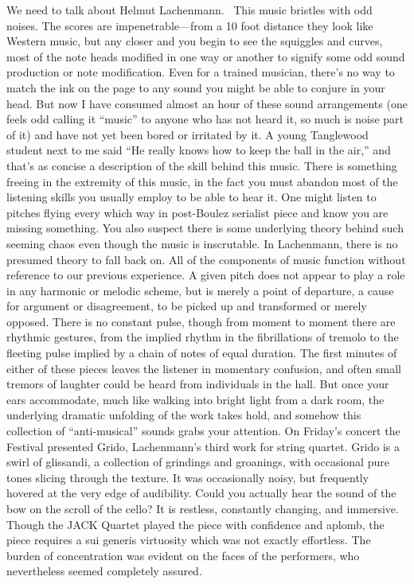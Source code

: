 We need to talk about Helmut Lachenmann.  This music bristles with odd noises. The scores are impenetrable—from a 10 foot distance they look like Western music, but any closer and you begin to see the squiggles and curves, most of the note heads modified in one way or another to signify some odd sound production or note modification. Even for a trained musician, there’s no way to match the ink on the page to any sound you might be able to conjure in your head. But now I have consumed almost an hour of these sound arrangements (one feels odd calling it “music” to anyone who has not heard it, so much is noise part of it) and have not yet been bored or irritated by it. A young Tanglewood student next to me said “He really knows how to keep the ball in the air,” and that’s as concise a description of the skill behind this music. There is something freeing in the extremity of this music, in the fact you must abandon most of the listening skills you usually employ to be able to hear it. One might listen to pitches flying every which way in post-Boulez serialist piece and know you are missing something. You also suspect there is some underlying theory behind such seeming chaos even though the music is inscrutable. In Lachenmann, there is no presumed theory to fall back on. All of the components of music function without reference to our previous experience. A given pitch does not appear to play a role in any harmonic or melodic scheme, but is merely a point of departure, a cause for argument or disagreement, to be picked up and transformed or merely opposed. There is no constant pulse, though from moment to moment there are rhythmic gestures, from the implied rhythm in the fibrillations of tremolo to the fleeting pulse implied by a chain of notes of equal duration. The first minutes of either of these pieces leaves the listener in momentary confusion, and often small tremors of laughter could be heard from individuals in the hall. But once your ears accommodate, much like walking into bright light from a dark room, the underlying dramatic unfolding of the work takes hold, and somehow this collection of “anti-musical” sounds grabs your attention. On Friday’s concert the Festival presented Grido, Lachenmann’s third work for string quartet. Grido is a swirl of glissandi, a collection of grindings and groanings, with occasional pure tones slicing through the texture. It was occasionally noisy, but frequently hovered at the very edge of audibility. Could you actually hear the sound of the bow on the scroll of the cello? It is restless, constantly changing, and immersive. Though the JACK Quartet played the piece with confidence and aplomb, the piece requires a sui generis virtuosity which was not exactly effortless. The burden of concentration was evident on the faces of the performers, who nevertheless seemed completely assured.


